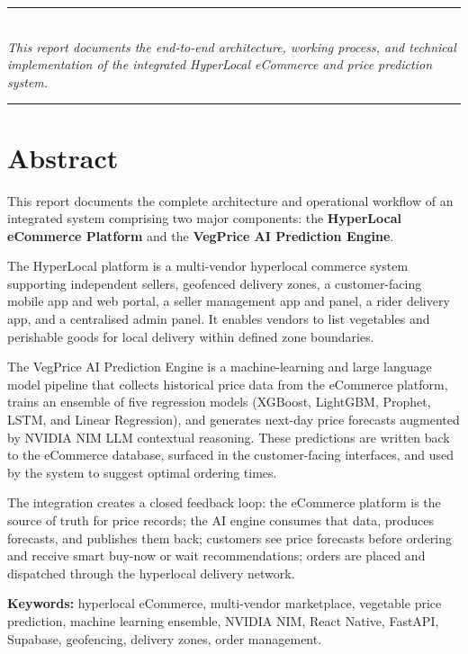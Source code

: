 \documentclass[12pt, a4paper, oneside]{report}
\begin{document}
\begin{titlepage}
\vspace{1.2cm}
\rule{\textwidth}{0.4pt}\\[0.3cm]
{\small\itshape
  This report documents the end-to-end architecture, working process, and technical\\
  implementation of the integrated HyperLocal eCommerce and price prediction system.
}\\[0.3cm]
\rule{\textwidth}{1.0pt}
\end{titlepage}

\chapter*{Abstract}

This report documents the complete architecture and operational workflow of an
integrated system comprising two major components: the \textbf{HyperLocal
eCommerce Platform} and the \textbf{VegPrice AI Prediction Engine}.

The HyperLocal platform is a multi-vendor hyperlocal commerce system supporting
independent sellers, geofenced delivery zones, a customer-facing mobile app and
web portal, a seller management app and panel, a rider delivery app, and a
centralised admin panel. It enables vendors to list vegetables and perishable
goods for local delivery within defined zone boundaries.

The VegPrice AI Prediction Engine is a machine-learning and large language model
pipeline that collects historical price data from the eCommerce platform, trains
an ensemble of five regression models (XGBoost, LightGBM, Prophet, LSTM, and
Linear Regression), and generates next-day price forecasts augmented by NVIDIA
NIM LLM contextual reasoning. These predictions are written back to the
eCommerce database, surfaced in the customer-facing interfaces, and used by the
system to suggest optimal ordering times.

The integration creates a closed feedback loop: the eCommerce platform is the
source of truth for price records; the AI engine consumes that data, produces
forecasts, and publishes them back; customers see price forecasts before ordering
and receive smart buy-now or wait recommendations; orders are placed and
dispatched through the hyperlocal delivery network.

\noindent\textbf{Keywords:} hyperlocal eCommerce, multi-vendor marketplace,
vegetable price prediction, machine learning ensemble, NVIDIA NIM, React Native,
FastAPI, Supabase, geofencing, delivery zones, order management.
\end{document}
